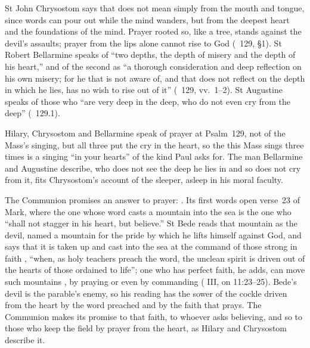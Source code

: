 St John Chrysostom says that  does not mean simply from
the mouth and tongue, since words can pour out while the mind wanders, but
from the deepest heart and the foundations of the mind. Prayer rooted so, like
a tree, stands against the devil's assaults; prayer from the lips alone
cannot rise to God (\ 129, §1). St Robert
Bellarmine speaks of ``two depths, the depth of misery and the depth of his
heart,'' and of the second as ``a thorough consideration and deep reflection
on his own misery; for he that is not aware of, and that does not reflect on
the depth in which he lies, has no wish to rise out of it'' (\ 129, vv.~1--2). St Augustine speaks of those who ``are very deep in
the deep, who do not even cry from the deep'' (\ 129.1).

Hilary, Chrysostom and Bellarmine speak of prayer at Psalm~129, not of the
Mass's singing, but all three put the cry in the heart, so the  this Mass sings three times is a singing ``in your hearts'' of the
kind Paul asks for. The man Bellarmine and Augustine describe, who does not
see the deep he lies in and so does not cry from it, fits Chrysostom's account
of the sleeper, asleep in his moral faculty.

The Communion promises an answer to prayer: . Its first words open
verse~23 of Mark, where the one whose word casts a mountain into the sea is
the one who ``shall not stagger in his heart, but believe.'' St Bede reads
that mountain as the devil, named a mountain for the pride by which he lifts
himself against God, and says that it is taken up and cast into the sea at
the command of those strong in faith , ``when, as holy teachers preach the word, the unclean
spirit is driven out of the hearts of those ordained to life''; one who has
perfect faith, he adds, can move such mountains , by praying or even by commanding ( III, on 11:23--25). Bede's devil is the parable's enemy, so his
reading has the sower of the cockle driven from the heart by the word preached
and by the faith that prays. The Communion makes its promise to that faith,
to whoever asks believing, and so to those who keep the field by prayer from
the heart, as Hilary and Chrysostom describe it.

